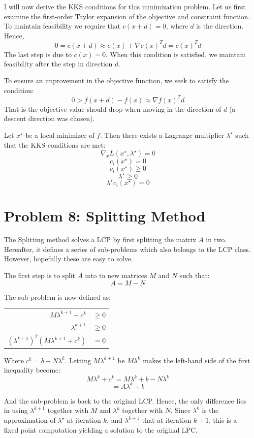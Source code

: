 \documentclass[10pt,oneside,a4paper,final,english]{memoir}
\begin{document}
I will now derive the KKS conditions for this minimization problem.
Let us first examine the first-order Taylor expansion of the objective
and constraint function. To maintain feasibility we require that
$c(x+d)=0$, where $d$ is the direction. Hence,
\[ 0 = c(x+d) \approx c(x) + \nabla c(x)^T d = c(x)^Td \]
The last step is due to $c(x) = 0$. When this condition is satisfied,
we maintain feasibility after the step in direction $d$.

To ensure an improvement in the objective function, we seek to satisfy
the condition:
\[ 0 > f(x + d) - f(x) \approx \nabla f(x)^T d\]
That is the objective value should drop when moving in the direction
of $d$ (a descent direction was chosen).



Let $x^\star$ be a local minimizer of $f$. Then there exists a
Lagrange multiplier $\lambda^\star$ such that the KKS conditions are
met:
\[\nabla_x L(x^\star, \lambda^\star) = 0\]
\[c_i(x^\star) = 0\]
\[c_i(x^\star) \geq 0\]
\[\lambda^\star \geq 0\]
\[\lambda^\star c_i(x^\star) = 0 \]




\section{Problem 8: Splitting Method}
\label{splitting}
The Splitting method solves a LCP by first splitting the matrix $A$ in
two. Hereafter, it defines a series of sub-problems which also belongs
to the LCP class. However, hopefully these are easy to solve.

The first step is to split $A$ into to new matrices $M$ and $N$ such
that:
\[ A = M - N \]

The sub-problem is now defined as:
\begin{center}\begin{tabular}{rl}
$M\lambda^{k+1} + c^k$ & $\geq 0$ \\
$\lambda^{k+1}$ & $\geq 0$\\
$(\lambda^{k+1})^T (M\lambda^{k+1} + c^k)$ & $= 0$
\end{tabular}\end{center}

Where $c^k = b - N\lambda^k$. Letting $M\lambda^{k+1}$ be $M\lambda^k$
makes the left-hand side of the first inequality become:
\[ M \lambda^k + c^k = M\lambda^k + b - N\lambda^k \]
\[ = A\lambda^k + b\]

And the sub-problem is back to the original LCP. Hence, the only
difference lies in using $\lambda^{k+1}$ together with $M$ and
$\lambda^k$ together with $N$. Since $\lambda^k$ is the approximation
of $\lambda^\star$ at iteration $k$, and $\lambda^{k+1}$ that at
iteration $k+1$, this is a fixed point computation yielding a solution
to the original LPC.
\end{document}

